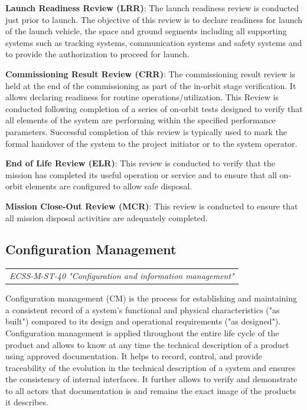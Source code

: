 \textbf{Launch Readiness Review (LRR)}: The launch readiness review is conducted just prior to launch. The objective of this review is to declare readiness for launch of the launch vehicle, the space and ground segments including all supporting systems such as tracking systems, communication systems and safety systems and to provide the authorization to proceed for launch.

\textbf{Commissioning Result Review (CRR)}: The commissioning result review is held at the end of the commissioning as part of the in-orbit stage verification. It allows declaring readiness for routine operations/utilization. This Review is conducted following completion of a series of on-orbit tests designed to verify that all elements of the system are performing within the specified performance parameters. Successful completion of this review is typically used to mark the formal handover of the system to the project initiator or to the system operator.

\textbf{End of Life Review (ELR)}: This review is conducted to verify that the mission has completed its useful operation or service and to ensure that all on-orbit elements are configured to allow safe disposal.

\textbf{Mission Close-Out Review (MCR)}: This review is conducted to ensure that all mission disposal activities are adequately completed.

\subsection{Configuration Management}
\label{sec:Configuration Management}

\begin{tabular}{l}
\textit{ECSS-M-ST-40 "Configuration and information management" \cite{ECSS-M-ST-40}}
\end{tabular}

Configuration management (CM) is the process for establishing and maintaining a consistent record of a system's functional and physical characteristics ("as built") compared to its design and operational requirements ("as designed"). Configuration management is applied throughout the entire life cycle of the product and allows to know at any time the technical description of a product using approved documentation. It helps to record, control, and provide traceability of the evolution in the technical description of a system and ensures the consistency of internal interfaces. It further allows to verify and demonstrate to all actors that documentation is and remains the exact image of the products it describes.

